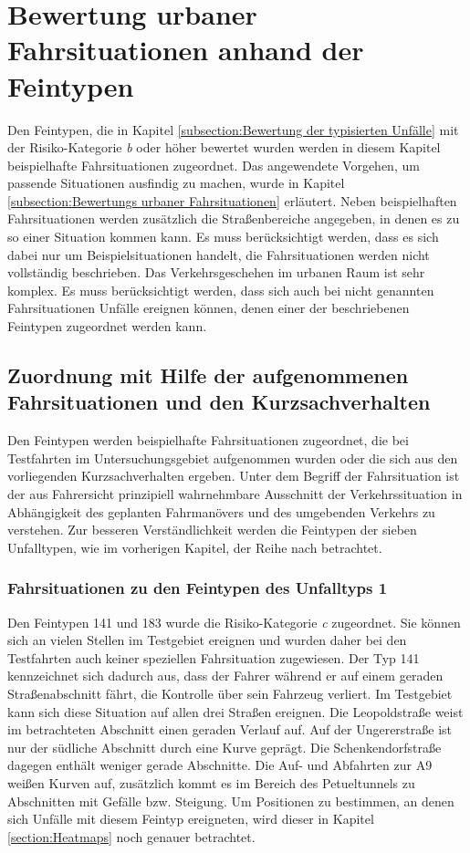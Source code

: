 \section{Bewertung urbaner Fahrsituationen anhand der Feintypen}\label{section:Zuordnung der Unfälle zu Fahrsituationen}
Den Feintypen, die in Kapitel \ref{subsection:Bewertung der typisierten Unfälle} mit der Risiko-Kategorie \textit{b} oder höher bewertet wurden werden in diesem Kapitel beispielhafte Fahrsituationen zugeordnet. Das angewendete Vorgehen, um passende Situationen ausfindig zu machen, wurde in Kapitel \ref{subsection:Bewertungs urbaner Fahrsituationen} erläutert. Neben beispielhaften Fahrsituationen werden zusätzlich die Straßenbereiche angegeben, in denen es zu so einer Situation kommen kann. Es muss berücksichtigt werden, dass es sich dabei nur um Beispielsituationen handelt, die Fahrsituationen werden nicht vollständig beschrieben. Das Verkehrsgeschehen im urbanen Raum  ist sehr komplex. Es muss berücksichtigt werden, dass sich auch bei nicht genannten Fahrsituationen Unfälle ereignen können, denen einer der beschriebenen Feintypen zugeordnet werden kann.

\subsection{Zuordnung mit Hilfe der aufgenommenen Fahrsituationen und den Kurzsachverhalten}\label{subsection:Zuordnung mit den aufgenommenen Fahrsituationen}
Den Feintypen werden beispielhafte Fahrsituationen zugeordnet, die bei Testfahrten im Untersuchungsgebiet aufgenommen wurden oder die sich aus den vorliegenden Kurzsachverhalten ergeben. Unter dem Begriff der Fahrsituation ist der aus Fahrersicht prinzipiell wahrnehmbare Ausschnitt der Verkehrssituation in Abhängigkeit des geplanten Fahrmanövers und des umgebenden Verkehrs zu verstehen. Zur besseren Verständlichkeit werden die Feintypen der sieben Unfalltypen, wie im vorherigen Kapitel, der Reihe nach betrachtet.

\subsubsection{Fahrsituationen zu den Feintypen des Unfalltyps 1}
Den Feintypen 141 und 183 wurde die Risiko-Kategorie \textit{c} zugeordnet. Sie können sich an vielen Stellen im Testgebiet ereignen und wurden daher bei den Testfahrten auch keiner speziellen Fahrsituation zugewiesen. Der Typ 141 kennzeichnet sich dadurch aus, dass der Fahrer während er auf einem geraden Straßenabschnitt fährt, die Kontrolle über sein Fahrzeug verliert. Im Testgebiet kann sich diese Situation auf allen drei Straßen ereignen. Die Leopoldstraße weist im betrachteten Abschnitt einen geraden Verlauf auf. Auf der Ungererstraße ist nur der südliche Abschnitt durch eine Kurve geprägt. Die Schenkendorfstraße dagegen enthält weniger gerade Abschnitte. Die Auf- und Abfahrten zur A9 weißen Kurven auf, zusätzlich kommt es im Bereich des Petueltunnels zu Abschnitten mit Gefälle bzw. Steigung. Um Positionen zu bestimmen, an denen sich Unfälle mit diesem Feintyp ereigneten, wird dieser in Kapitel \ref{section:Heatmaps} noch genauer betrachtet.


